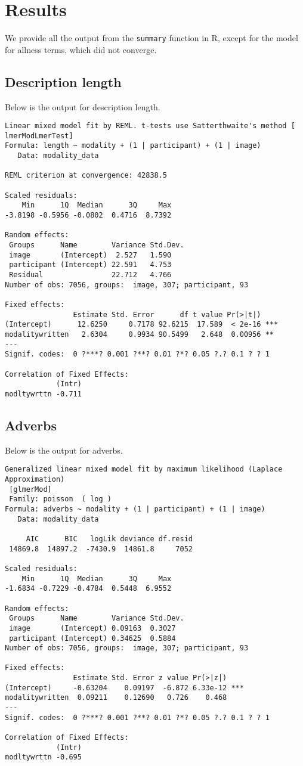\documentclass[11pt]{article}
\begin{document}
\section{Results}
We provide all the output from the \texttt{summary} function in R, except for the model for allness terms, which did not converge.

\subsection{Description length}
Below is the output for description length.
\begin{verbatim}
Linear mixed model fit by REML. t-tests use Satterthwaite's method [
lmerModLmerTest]
Formula: length ~ modality + (1 | participant) + (1 | image)
   Data: modality_data

REML criterion at convergence: 42838.5

Scaled residuals: 
    Min      1Q  Median      3Q     Max 
-3.8198 -0.5956 -0.0802  0.4716  8.7392 

Random effects:
 Groups      Name        Variance Std.Dev.
 image       (Intercept)  2.527   1.590   
 participant (Intercept) 22.591   4.753   
 Residual                22.712   4.766   
Number of obs: 7056, groups:  image, 307; participant, 93

Fixed effects:
                Estimate Std. Error      df t value Pr(>|t|)    
(Intercept)      12.6250     0.7178 92.6215  17.589  < 2e-16 ***
modalitywritten   2.6304     0.9934 90.5499   2.648  0.00956 ** 
---
Signif. codes:  0 ?***? 0.001 ?**? 0.01 ?*? 0.05 ?.? 0.1 ? ? 1

Correlation of Fixed Effects:
            (Intr)
modltywrttn -0.711
\end{verbatim}

\subsection{Adverbs}
Below is the output for adverbs.
\begin{verbatim}
Generalized linear mixed model fit by maximum likelihood (Laplace  Approximation)
 [glmerMod]
 Family: poisson  ( log )
Formula: adverbs ~ modality + (1 | participant) + (1 | image)
   Data: modality_data

     AIC      BIC   logLik deviance df.resid 
 14869.8  14897.2  -7430.9  14861.8     7052 

Scaled residuals: 
    Min      1Q  Median      3Q     Max 
-1.6834 -0.7229 -0.4784  0.5448  6.9552 

Random effects:
 Groups      Name        Variance Std.Dev.
 image       (Intercept) 0.09163  0.3027  
 participant (Intercept) 0.34625  0.5884  
Number of obs: 7056, groups:  image, 307; participant, 93

Fixed effects:
                Estimate Std. Error z value Pr(>|z|)    
(Intercept)     -0.63204    0.09197  -6.872 6.33e-12 ***
modalitywritten  0.09211    0.12690   0.726    0.468    
---
Signif. codes:  0 ?***? 0.001 ?**? 0.01 ?*? 0.05 ?.? 0.1 ? ? 1

Correlation of Fixed Effects:
            (Intr)
modltywrttn -0.695
\end{verbatim}
\end{document}

